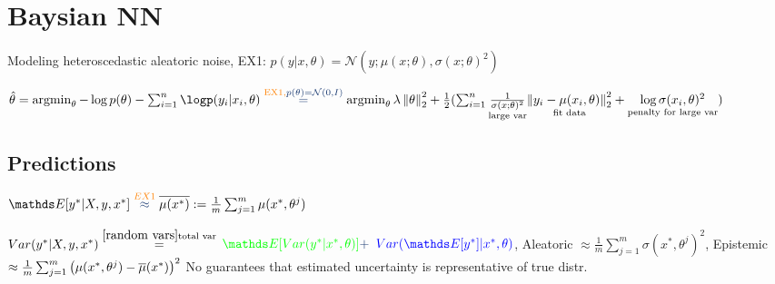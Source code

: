 \section{Baysian NN}
Modeling heteroscedastic aleatoric noise, \color{orange}EX1: $p(y|x,\theta) =
\mathcal{N}(y; \mu(x;\theta), \sigma(x; \theta)^{2})$ \color{black}

$\hat{\theta} = \argmin_\theta - \log p(\theta) - \sum_{i=1}^{n}\logp(y_{i}|x_{i},\theta)
\overset{\color{orange} \text{EX1}, \color{myblue} p(\theta)=\mathcal{N}(0,I)}{=}
\argmin_\theta \lambda \norm{\theta}_{2}^{2} +
\frac{1}{2} (\sum_{i=1}^{n} \underset{\text{large var}}{\frac{1}{\sigma(x;\theta)^{2}}}
    \underset{\text{fit data}}{\norm{y_{i}-\mu(x_{i},\theta)}^2_{2}}
 + \underset{\text{penalty for large var}}{\log \sigma(x_{i}, \theta)^{2}})$

\subsection{Predictions}

$\E{y^{*}|X,y,x^{*}} \overset{\color{orange}EX1 \color{myblue}}{\approx}
\bar{\mu(x^{*})} := \frac{1}{m} \sum_{j=1}^{m}\mu(x^{*}, \theta^{j}) $

$Var(y^{*}|X,y,x^{*}) \overset{\ref{random vars} \text{total var}}{=}$
$\color{green}\E {Var(y^{*}|x^{*},\theta)} \color{myblue}+$
$\color{blue}Var(\E{y^{*}}|x^{*}, \theta) \color{myblue}$,
\color{green}Aleatoric \color{black}$\approx \frac{1}{m} \sum_{j=1}^{m}\sigma(x^{*},\theta^{j})^{2}$,
\color{blue} Epistemic \color{black}$\approx \frac{1}{m} \sum_{j=1}^{m}\left(\mu(x^{*},\theta^{j})-\overline{\mu}(x^{*})\right)^{2}$
No guarantees that estimated uncertainty is representative of true distr.

%
%


